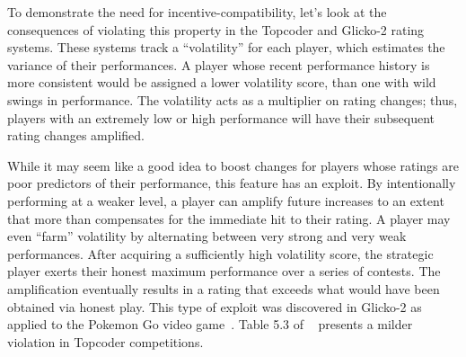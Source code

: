 

To demonstrate the need for incentive-compatibility, let's look at the consequences of violating this property in the Topcoder and Glicko-2 rating systems. These systems track a ``volatility'' for each player, which estimates the variance of their performances. A player whose recent performance history is more consistent would be assigned a lower volatility score, than one with wild swings in performance. The volatility acts as a multiplier on rating changes; thus, players with an extremely low or high performance will have their subsequent rating changes amplified.

While it may seem like a good idea to boost changes for players whose ratings are poor predictors of their performance, this feature has an exploit. By intentionally performing at a weaker level, a player can amplify future increases to an extent that more than compensates for the immediate hit to their rating. A player may even ``farm'' volatility by alternating between very strong and very weak performances. After acquiring a sufficiently high volatility score, the strategic player exerts their honest maximum performance over a series of contests. The amplification eventually results in a rating that exceeds what would have been obtained via honest play. This type of exploit was discovered in Glicko-2 as applied to the Pokemon Go video game~\cite{pokemongo}. Table 5.3 of ~\cite{forivsektheoretical} presents a milder violation in Topcoder competitions.

